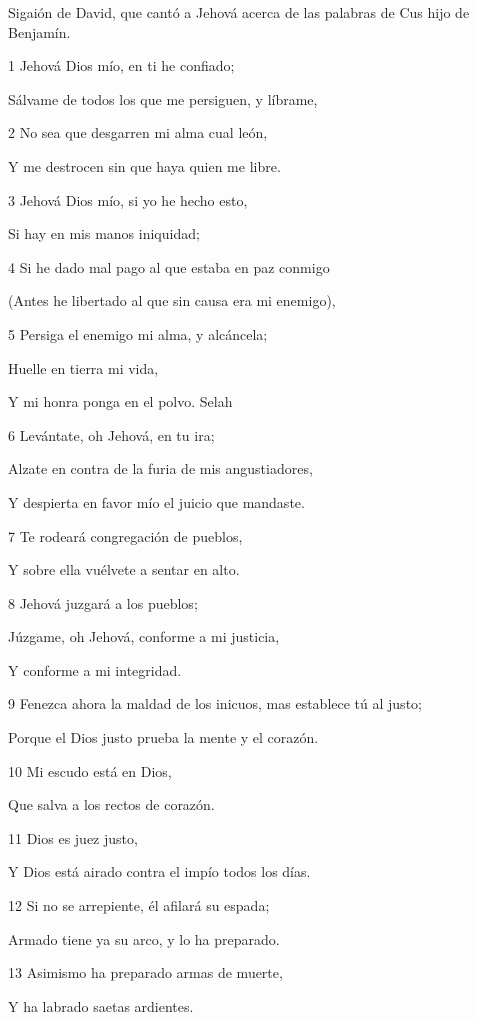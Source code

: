 \par Sigaión de David, que cantó a Jehová acerca de las palabras de Cus hijo de Benjamín.

\par 1 Jehová Dios mío, en ti he confiado;
\par Sálvame de todos los que me persiguen, y líbrame,
\par 2 No sea que desgarren mi alma cual león,
\par Y me destrocen sin que haya quien me libre.
\par 3 Jehová Dios mío, si yo he hecho esto,
\par Si hay en mis manos iniquidad;
\par 4 Si he dado mal pago al que estaba en paz conmigo
\par (Antes he libertado al que sin causa era mi enemigo),
\par 5 Persiga el enemigo mi alma, y alcáncela;
\par Huelle en tierra mi vida,
\par Y mi honra ponga en el polvo. Selah
\par 6 Levántate, oh Jehová, en tu ira;
\par Alzate en contra de la furia de mis angustiadores,
\par Y despierta en favor mío el juicio que mandaste.
\par 7 Te rodeará congregación de pueblos,
\par Y sobre ella vuélvete a sentar en alto.
\par 8 Jehová juzgará a los pueblos;
\par Júzgame, oh Jehová, conforme a mi justicia,
\par Y conforme a mi integridad.
\par 9 Fenezca ahora la maldad de los inicuos, mas establece tú al justo;
\par Porque el Dios justo prueba la mente y el corazón.
\par 10 Mi escudo está en Dios,
\par Que salva a los rectos de corazón.
\par 11 Dios es juez justo,
\par Y Dios está airado contra el impío todos los días.
\par 12 Si no se arrepiente, él afilará su espada;
\par Armado tiene ya su arco, y lo ha preparado.
\par 13 Asimismo ha preparado armas de muerte,
\par Y ha labrado saetas ardientes.
